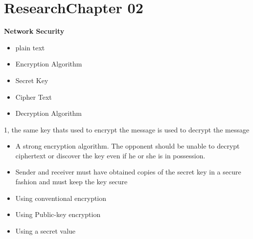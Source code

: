 \documentclass[../CIT288SecurityResearchNotebook.tex]{subfiles}
\begin{document}

\chapter[Research Ch. 02]{Research\linebreak[1] Chapter 02 \hspace*{\fill}{\date}}
\noindent\textbf{{Network Security} }                             


\begin{itemize}
	\item plain text
	\item Encryption Algorithm
	\item Secret Key
	\item Cipher Text
	\item Decryption Algorithm
\end{itemize}


 1, the same key thats used to encrypt the message is used to decrypt the message


\begin{itemize}
	\item A strong encryption algorithm. The opponent should be unable to decrypt ciphertext or discover the key even if he or
	she is in possession.
	\item Sender and receiver must have obtained copies of the secret key in a secure fashion and must keep the key secure
\end{itemize}


\begin{itemize}
	\item Using conventional encryption
	\item Using Public-key encryption
	\item Using a secret value
\end{itemize}
\end{document}
